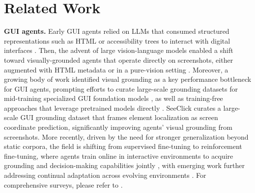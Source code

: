 \documentclass{article}
\begin{document}
\section{Related Work}

\noindent\textbf{GUI agents.}\quad
Early GUI agents relied on LLMs that consumed structured representations such as HTML or accessibility trees to interact with digital interfaces \citep{zheng2023synapse,lu2024omniparser,zhang2024large}. 
Then, the advent of large vision-language models enabled a shift toward visually-grounded agents that operate directly on screenshots, either augmented with HTML metadata \citep{hong2024cogagent} or in a pure-vision setting \citep{cheng2024seeclick}. 
Moreover, a growing body of work identified visual grounding as a key performance bottleneck for GUI agents, prompting efforts to curate large-scale grounding datasets for mid-training specialized GUI foundation models \citep{cheng2024seeclick,gou2024navigating, wu2024atlas,shen2024falcon,qin2025ui}, as well as training-free approaches that leverage pretrained models directly \citep{xu2025attention}. 
SeeClick \citep{cheng2024seeclick} curates a large-scale GUI grounding dataset that frames element localization as screen coordinate prediction, significantly improving agents' visual grounding from screenshots.
More recently, driven by the need for stronger generalization beyond static corpora, the field is shifting from supervised fine-tuning to reinforcement fine-tuning, where agents train online in interactive environments to acquire grounding and decision-making capabilities jointly \citep{lu2025ui, zhou2025gui, yuan2025enhancing, tang2025gui}, with emerging work further addressing continual adaptation across evolving environments \citep{liu2026continual, yao2026cgl}. 
For comprehensive surveys, please refer to \citep{wang2024gui, nguyen2025gui}.
\end{document}
